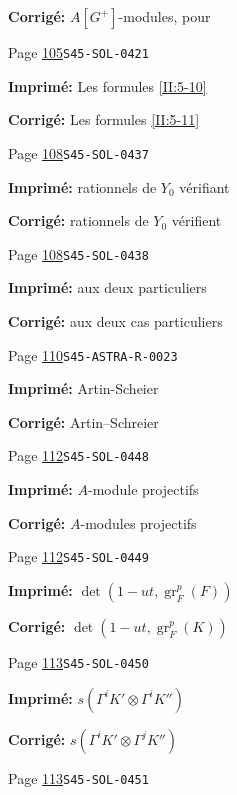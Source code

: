 \documentclass[oneside]{book}
\DeclareMathOperator{\gr}{gr}
\theoremstyle{sga-source}
\theoremstyle{sga-source-dash}
\theoremstyle{sga-source-dotdash}
\theoremstyle{sga-source-number-note-dash}
\theoremstyle{sga-source-note-number-dotdash}
\theoremstyle{sga-source-example-dotdash}
\theoremstyle{sga-source-inline-number}
\theoremstyle{sga-source-bare-number}
\theoremstyle{sga-source}
\begin{document}
\begin{description}
\par\noindent\textbf{Corrigé:} $A[G^+]$-modules, pour
\smallskip
\item[\hypertarget{apparatus:FR-0062}{62}] Page \hyperlink{printpage:fr:105}{105}\quad\texttt{S45-SOL-0421}
\par\noindent\textbf{Imprimé:} Les formules \ref{II:5-10}
\par\noindent\textbf{Corrigé:} Les formules \ref{II:5-11}
\smallskip
\item[\hypertarget{apparatus:FR-0063}{63}] Page \hyperlink{printpage:fr:108}{108}\quad\texttt{S45-SOL-0437}
\par\noindent\textbf{Imprimé:} rationnels de $Y_0$ vérifiant
\par\noindent\textbf{Corrigé:} rationnels de $Y_0$ vérifient
\smallskip
\item[\hypertarget{apparatus:FR-0064}{64}] Page \hyperlink{printpage:fr:108}{108}\quad\texttt{S45-SOL-0438}
\par\noindent\textbf{Imprimé:} aux deux particuliers
\par\noindent\textbf{Corrigé:} aux deux cas particuliers
\smallskip
\item[\hypertarget{apparatus:FR-0065}{65}] Page \hyperlink{printpage:fr:110}{110}\quad\texttt{S45-ASTRA-R-0023}
\par\noindent\textbf{Imprimé:} Artin-Scheier
\par\noindent\textbf{Corrigé:} Artin--Schreier
\smallskip
\item[\hypertarget{apparatus:FR-0066}{66}] Page \hyperlink{printpage:fr:112}{112}\quad\texttt{S45-SOL-0448}
\par\noindent\textbf{Imprimé:} $A$-module projectifs
\par\noindent\textbf{Corrigé:} $A$-modules projectifs
\smallskip
\item[\hypertarget{apparatus:FR-0067}{67}] Page \hyperlink{printpage:fr:112}{112}\quad\texttt{S45-SOL-0449}
\par\noindent\textbf{Imprimé:} \(\det(1-u t,\gr_F^p(F))\)
\par\noindent\textbf{Corrigé:} \(\det(1-u t,\gr_F^p(K))\)
\smallskip
\item[\hypertarget{apparatus:FR-0068}{68}] Page \hyperlink{printpage:fr:113}{113}\quad\texttt{S45-SOL-0450}
\par\noindent\textbf{Imprimé:} \(s(\Gamma^i K'\otimes \Gamma^i K'')\)
\par\noindent\textbf{Corrigé:} \(s(\Gamma^i K'\otimes \Gamma^j K'')\)
\smallskip
\item[\hypertarget{apparatus:FR-0069}{69}] Page \hyperlink{printpage:fr:113}{113}\quad\texttt{S45-SOL-0451}

\end{description}
\end{document}
